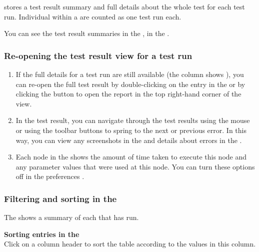 \app{} stores a test result summary and full details about the whole test for each test run. Individual \gdsuites{} within a \gdjob{} are counted as one test run each. 

You can see the test result summaries in the \reportpersp{}, in the \gdtestsummaryview{}. 

\subsubsection{Re-opening the test result view for a test run}
\label{TasksReopenTestResult}
\begin{enumerate}
\item If the full details for a test run are still available (the column  shows ), you can re-open the full test result by double-clicking on the entry in the \gdtestsummaryview{} or by clicking the button to open the report in the top right-hand corner of the view. 
\item In the test result, you can navigate through the test results using the mouse or using the toolbar buttons to spring to the next or previous error. In this way, you can view any screenshots in the \gdimgview{} and details about errors in the \gdpropview{}.
\item Each node in the \gdtestresultview{} shows the amount of time taken to execute this node and any parameter values that were used at this node. You can turn these options off in the preferences .
\end{enumerate}

\subsubsection{Filtering and sorting in the \gdtestsummaryview{}}

The \gdtestsummaryview{} shows a summary of each \gdsuite{} that has run. 

\textbf{Sorting entries in the \gdtestsummaryview}\\

Click on a column header to sort the table according to the values in this column. 


